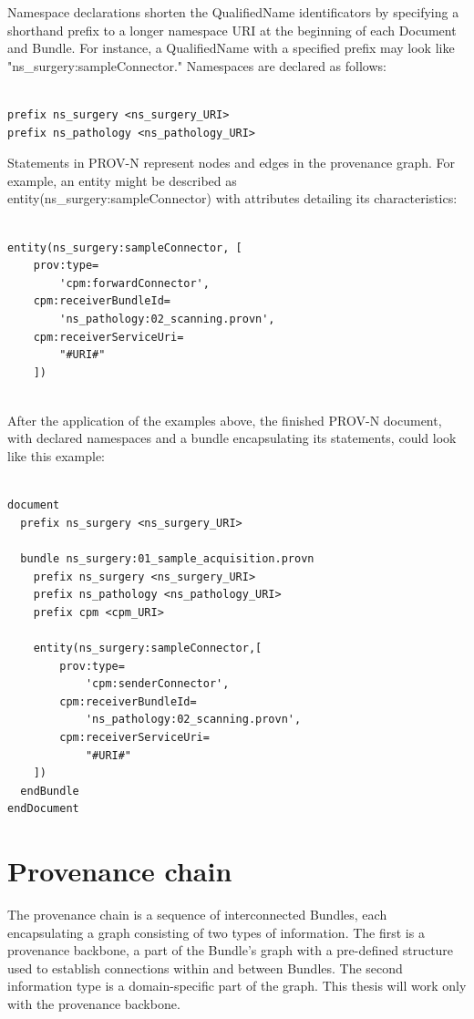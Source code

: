 \documentclass[
  digital,     %
  oneside,     %
  nosansbold,  %
  nocolorbold, %
  lof,         %
  lot,         %
]{fithesis4}
\begin{document}
Namespace declarations shorten the QualifiedName identificators by specifying a shorthand prefix to a longer namespace URI at the beginning of each Document and Bundle. For instance, a QualifiedName with a specified prefix may look like "ns\_surgery:sampleConnector." Namespaces are declared as follows:

\begin{verbatim}

prefix ns_surgery <ns_surgery_URI>
prefix ns_pathology <ns_pathology_URI>

\end{verbatim}

Statements in PROV-N represent nodes and edges in the provenance graph. For example, an entity might be described as \\entity(ns\_surgery:sampleConnector) with attributes detailing its characteristics:

\begin{verbatim}

entity(ns_surgery:sampleConnector, [
    prov:type=
        'cpm:forwardConnector', 
    cpm:receiverBundleId=
        'ns_pathology:02_scanning.provn', 
    cpm:receiverServiceUri=
        "#URI#"
    ])
    
\end{verbatim}

After the application of the examples above, the finished PROV-N document, with declared namespaces and a bundle encapsulating its statements, could look like this example:

\begin{verbatim}

document
  prefix ns_surgery <ns_surgery_URI>

  bundle ns_surgery:01_sample_acquisition.provn
    prefix ns_surgery <ns_surgery_URI>
    prefix ns_pathology <ns_pathology_URI>
    prefix cpm <cpm_URI>

    entity(ns_surgery:sampleConnector,[
        prov:type=
            'cpm:senderConnector',
        cpm:receiverBundleId=
            'ns_pathology:02_scanning.provn',
        cpm:receiverServiceUri=
            "#URI#"
    ])
  endBundle
endDocument

\end{verbatim}
\shorthandon{-}

\section{Provenance chain} \label{s-provchain}
\shorthandoff{-}
The provenance chain is a sequence of interconnected Bundles, each encapsulating a graph consisting of two types of information. The first is a provenance backbone, a part of the Bundle's graph with a pre-defined structure used to establish connections within and between Bundles. The second information type is a domain-specific part of the graph. This thesis will work only with the provenance backbone. 
\end{document}
